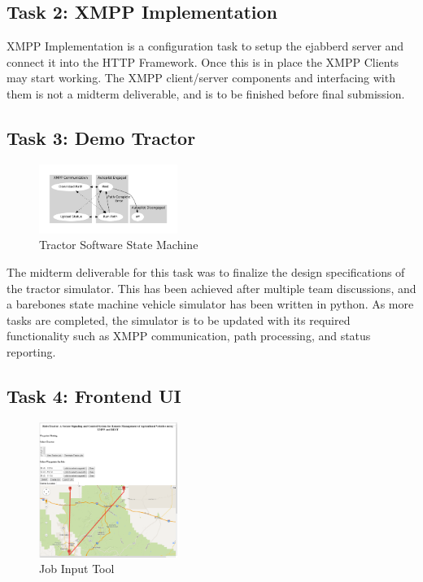 \documentclass[conference,12pt]{IEEEtran}
\begin{document}
\subsection{Task 2: XMPP Implementation}
XMPP Implementation is a configuration task to setup the ejabberd
server and connect it into the HTTP Framework. Once this is in place the XMPP
Clients may start working. The XMPP client/server components and interfacing with them is not a midterm deliverable, and is to be finished before final submission.
\subsection{Task 3: Demo Tractor}

\begin{figure}
\centering
\includegraphics[width=0.4\textwidth]{machine.pdf}
\caption{Tractor Software State Machine}
\label{fig:tractorstatemachine}
\end{figure}
The midterm deliverable for this task was to finalize the design specifications of the tractor simulator. This has been achieved after multiple team discussions, and a barebones
state machine vehicle simulator has been written in python. As more tasks are completed, the simulator is to be updated with its required functionality such as XMPP communication, path processing, and status reporting.
\subsection{Task 4: Frontend UI}
\begin{figure}
\centering
\includegraphics[width=0.4\textwidth]{../PlottingV1.png}
\caption{Job Input Tool}
\label{fig:jobinput}
\end{figure}
\end{document}
